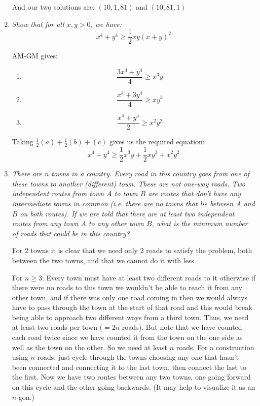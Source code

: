 \documentclass{article}
\begin{document}
\begin{enumerate}[1.]
And our two solutions are: $(10,1,81)$ and $(10,81,1)$


\vspace{24pt}
\item %
{\itshape Show that for all $x,y > 0$, we have:
$$ x^4 + y^4 \geq \frac{1}{2} xy (x+y)^2 $$}

AM-GM gives:
\begin{enumerate}
\item $$\frac{3x^4+y^4}{4}\geq x^3y$$
\item $$\frac{x^4+3y^4}{4}\geq xy^3$$
\item $$\frac{x^4+y^4}{2}\geq x^2y^2$$
\end{enumerate}

Taking $\frac{1}{2}(a)+\frac{1}{2}(b)+(c)$ gives us the required equation:
$$ x^4 + y^4 \geq \frac{1}{2} x^3y + \frac{1}{2} xy^3 + x^2y^2  $$


\vspace{24pt}
\item %
{\itshape There are $n$ towns in a country.
Every road in this country goes from one of these towns to another (different) town. These are not one-way roads.
Two independent routes from town $A$ to town $B$ are routes that don't have any intermediate towns in common (i.e. there are no towns that lie between $A$ and $B$ on both routes).
If we are told that there are at least two independent routes from any town $A$ to any other town $B$, what is the minimum number of roads that could be in this country?}

For 2 towns it is clear that we need only 2 roads to satisfy the problem, both between the two towns, and that we cannot do it with less.

For $n \geq 3$:
Every town must have at least two different roads to it otherwise if there were no roads to this town we wouldn't be able to reach it from any other town, and if there was only one road coming in then we would always have to pass through the town at the start of that road and this would break being able to approach two different ways from a third town. Thus, we need at least two roads per town ($=2n$ roads). But note that we have counted each road twice since we have counted it from the town on the one side as well as the town on the other. So we need at least $n$ roads. For a construction using $n$ roads, just cycle through the towns choosing any one that hasn't been connected and connecting it to the last town, then connect the last to the first. Now we have two routes between any two towns, one going forward on this cycle and the other going backwards. (It may help to visualize it as an $n$-gon.)



\end{enumerate}
\end{document}
